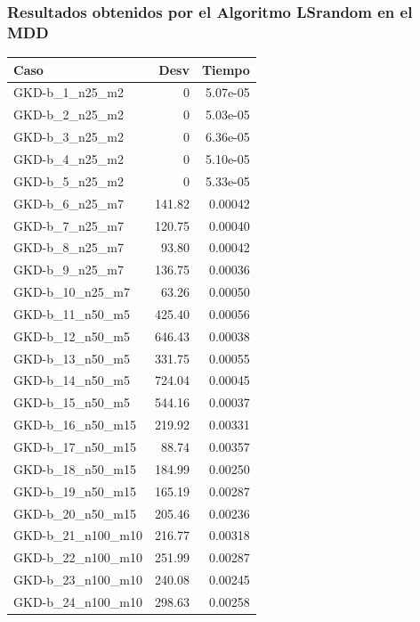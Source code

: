 \documentclass{article}
\begin{document}
\newpage
\subsubsection{Resultados obtenidos por el Algoritmo LSrandom en el MDD}

\begin{table}[ht]
\centering
\footnotesize
\begin{tabular}{|l|r|r|}
\hline
\textbf{Caso} & \textbf{Desv} & \textbf{Tiempo} \\ \hline
GKD-b\_1\_n25\_m2 & 0 & 5.07e-05 \\ \hline
GKD-b\_2\_n25\_m2 & 0 & 5.03e-05 \\ \hline
GKD-b\_3\_n25\_m2 & 0 & 6.36e-05 \\ \hline
GKD-b\_4\_n25\_m2 & 0 & 5.10e-05 \\ \hline
GKD-b\_5\_n25\_m2 & 0 & 5.33e-05 \\ \hline
GKD-b\_6\_n25\_m7 & 141.82 & 0.00042 \\ \hline
GKD-b\_7\_n25\_m7 & 120.75 & 0.00040 \\ \hline
GKD-b\_8\_n25\_m7 & 93.80 & 0.00042 \\ \hline
GKD-b\_9\_n25\_m7 & 136.75 & 0.00036 \\ \hline
GKD-b\_10\_n25\_m7 & 63.26 & 0.00050 \\ \hline
GKD-b\_11\_n50\_m5 & 425.40 & 0.00056 \\ \hline
GKD-b\_12\_n50\_m5 & 646.43 & 0.00038 \\ \hline
GKD-b\_13\_n50\_m5 & 331.75 & 0.00055 \\ \hline
GKD-b\_14\_n50\_m5 & 724.04 & 0.00045 \\ \hline
GKD-b\_15\_n50\_m5 & 544.16 & 0.00037 \\ \hline
GKD-b\_16\_n50\_m15 & 219.92 & 0.00331 \\ \hline
GKD-b\_17\_n50\_m15 & 88.74 & 0.00357 \\ \hline
GKD-b\_18\_n50\_m15 & 184.99 & 0.00250 \\ \hline
GKD-b\_19\_n50\_m15 & 165.19 & 0.00287 \\ \hline
GKD-b\_20\_n50\_m15 & 205.46 & 0.00236 \\ \hline
GKD-b\_21\_n100\_m10 & 216.77 & 0.00318 \\ \hline
GKD-b\_22\_n100\_m10 & 251.99 & 0.00287 \\ \hline
GKD-b\_23\_n100\_m10 & 240.08 & 0.00245 \\ \hline
GKD-b\_24\_n100\_m10 & 298.63 & 0.00258 \\ \hline

\end{tabular}
\end{table}
\end{document}
